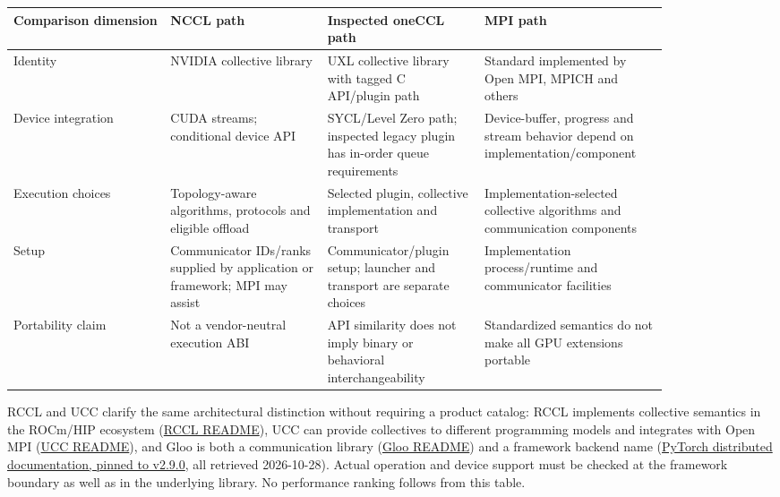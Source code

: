 \nopagebreak[4]
\begin{longtable}[]{@{}
  >{\raggedright\arraybackslash}p{0.2127\linewidth}
  >{\raggedright\arraybackslash}p{0.2127\linewidth}
  >{\raggedright\arraybackslash}p{0.2127\linewidth}
  >{\raggedright\arraybackslash}p{0.2127\linewidth}@{}}
\toprule\noalign{}
\begin{minipage}[b]{\linewidth}\raggedright
Comparison dimension
\end{minipage} & \begin{minipage}[b]{\linewidth}\raggedright
NCCL path
\end{minipage} & \begin{minipage}[b]{\linewidth}\raggedright
Inspected oneCCL path
\end{minipage} & \begin{minipage}[b]{\linewidth}\raggedright
MPI path
\end{minipage} \\
\midrule\noalign{}
\endhead
\bottomrule\noalign{}
\endlastfoot
Identity & NVIDIA collective library & UXL collective library with
tagged C API/plugin path & Standard implemented by Open MPI, MPICH and
others \\
\noalign{\label{tab:9.3}}
Device integration & CUDA streams; conditional device API & SYCL/Level
Zero path; inspected legacy plugin has in-order queue requirements &
Device-buffer, progress and stream behavior depend on
implementation/component \\
Execution choices & Topology-aware algorithms, protocols and eligible
offload & Selected plugin, collective implementation and transport &
Implementation-selected collective algorithms and communication
components \\
Setup & Communicator IDs/ranks supplied by application or framework; MPI
may assist & Communicator/plugin setup; launcher and transport are
separate choices & Implementation process/runtime and communicator
facilities \\
Portability claim & Not a vendor-neutral execution ABI & API similarity
does not imply binary or behavioral interchangeability & Standardized
semantics do not make all GPU extensions portable \\
\end{longtable}

RCCL and UCC clarify the same architectural distinction without
requiring a product catalog: RCCL implements collective semantics in the
ROCm/HIP ecosystem
(\href{https://raw.githubusercontent.com/ROCm/rccl/develop/README.md}{RCCL
README}), UCC can provide collectives to different programming models
and integrates with Open MPI
(\href{https://raw.githubusercontent.com/openucx/ucc/master/README.md}{UCC
README}), and Gloo is both a communication library
(\href{https://raw.githubusercontent.com/pytorch/gloo/main/README.md}{Gloo
README}) and a framework backend name
(\href{https://raw.githubusercontent.com/pytorch/pytorch/v2.9.0/docs/source/distributed.md}{PyTorch
distributed documentation, pinned to v2.9.0}, all retrieved 2026-10-28).
Actual operation and device support must be checked at the framework
boundary as well as in the underlying library. No performance ranking
follows from this table.


